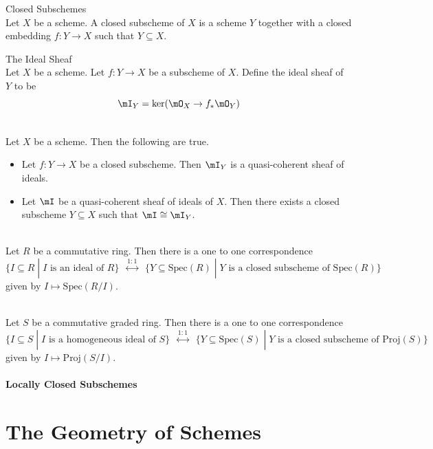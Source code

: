 \documentclass[a4paper]{article}
\begin{document}
\begin{defn}{Closed Subschemes}{}\\
Let $X$ be a scheme. A closed subscheme of $X$ is a scheme $Y$ together with a closed embedding $f:Y\to X$ such that $Y\subseteq X$. 
\end{defn}

\begin{defn}{The Ideal Sheaf}{}\\
Let $X$ be a scheme. Let $f:Y\to X$ be a subscheme of $X$. Define the ideal sheaf of $Y$ to be $$\mI_Y=\ker(\mO_X\to f_\ast\mO_Y)$$
\end{defn}

\begin{prp}{}{}\\
Let $X$ be a scheme. Then the following are true. 
\begin{itemize}
\item Let $f:Y\to X$ be a closed subscheme. Then $\mI_Y$ is a quasi-coherent sheaf of ideals. 
\item Let $\mI$ be a quasi-coherent sheaf of ideals of $X$. Then there exists a closed subscheme $Y\subseteq X$ such that $\mI\cong\mI_Y$. 
\end{itemize}
\end{prp}

\begin{prp}{}{}\\
Let $R$ be a commutative ring. Then there is a one to one correspondence $$\{I\subseteq R\;|\;I\text{ is an ideal of }R\}\;\;\overset{1:1}{\longleftrightarrow}\;\;\{Y\subseteq\text{Spec}(R)\;|\;Y\text{ is a closed subscheme of Spec}(R)\}$$ given by $I\mapsto\text{Spec}(R/I)$. 
\end{prp}

\begin{prp}{}{}\\
Let $S$ be a commutative graded ring. Then there is a one to one correspondence $$\{I\subseteq S\;|\;I\text{ is a homogeneous ideal of }S\}\;\;\overset{1:1}{\longleftrightarrow}\;\;\{Y\subseteq\text{Spec}(S)\;|\;Y\text{ is a closed subscheme of Proj}(S)\}$$ given by $I\mapsto\text{Proj}(S/I)$. 
\end{prp}

\subsection{Locally Closed Subschemes}

\pagebreak

\part{The Geometry of Schemes}
\end{document}
